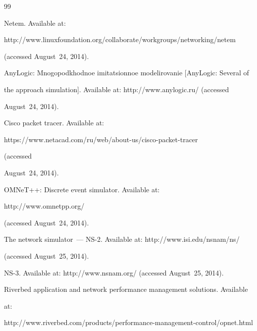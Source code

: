 {\small\frenchspacing


{%




\begin{thebibliography}{99}













Netem. Available at: {\sf


http://www.linuxfoundation.org/collaborate/workgroups/\linebreak networking/netem}


(accessed August~24, 2014).




AnyLogic: Mnogopodkhodnoe imitatsionnoe modelirovanie [AnyLogic: Several of


the approach simulation]. Available at: {\sf http://www.anylogic.ru/} (accessed


August~24, 2014).




Cisco packet tracer. Available at: {\sf


https://www.netacad.com/ru/web/about-us/cisco-packet-tracer} (accessed


August~24, 2014).




OMNeT++: Discrete event simulator. Available at: {\sf


http://www.omnetpp.org/} (accessed August~24, 2014).




The network simulator~--- NS-2. Available at: {\sf http://www.isi.edu/nsnam/ns/}


(accessed August~25, 2014).




NS-3. Available at: {\sf http://www.nsnam.org/} (accessed August~25, 2014).




Riverbed application and network performance management solutions. Available


at: {\sf


http://www.riverbed.com/products/performance-management-control/opnet.html}



\end{thebibliography}}}
